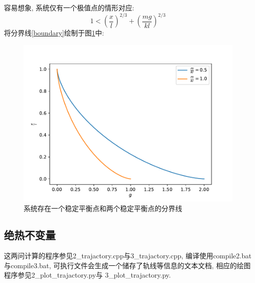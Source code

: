 \documentclass[a4paper,zihao=5,UTF8]{ctexart}
\begin{document}
    容易想象, 系统仅有一个极值点的情形对应:
    \begin{equation}
        1 < \left(\frac{x}{l}\right)^{2/3} + \left(\frac{mg}{kl}\right)^{2/3}
    \end{equation}
    将分界线\ref{boundary}绘制于图\ref{boundary figure}中:
    \begin{figure}
        \centering
        \includegraphics[scale=0.6]{1_boundary.pdf}
        \caption{系统存在一个稳定平衡点和两个稳定平衡点的分界线}
        \label{boundary figure}
    \end{figure} 
    \subsection{绝热不变量}
    这两问计算的程序参见2\_trajactory.cpp与3\_trajactory.cpp, 编译使用compile2.bat与compile3.bat, 
    可执行文件会生成一个储存了轨线等信息的文本文档, 相应的绘图程序参见2\_plot\_trajactory.py与
    3\_plot\_trajactory.py.
\end{document}
